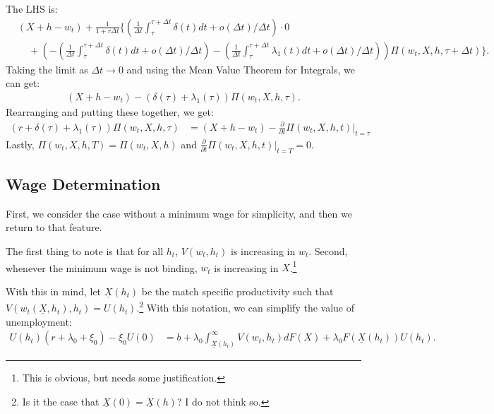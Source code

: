 \documentclass[11pt]{article}
\begin{document}
The LHS is:
\begin{align*}
         &(X + h - w_t) + \frac{1}{1+r\Delta t} \{
         ( \frac{1}{\Delta t}\textstyle\int_{\tau}^{\tau + \Delta t}
         \delta(t) dt + o(\Delta t)/\Delta t) \cdot 0 \\
         &\;\;\;\; +(-(\frac{1}{\Delta t}\textstyle\int_{\tau}^{\tau+\Delta t}
                       \delta(t)dt + o(\Delta
                       t)/\Delta t)-(\frac{1}{\Delta t}\textstyle\int_{\tau}^{\tau + \Delta t}
                       \lambda_1(t)dt + o(\Delta t)/\Delta t))
                   \Pi(w_t,X,h,\tau + \Delta t)\}
.\end{align*}
Taking the limit as $\Delta t \rightarrow 0$ and using the Mean Value Theorem for Integrals, we can get:
\begin{align*}
         (X + h - w_t) - (\delta(\tau) + \lambda_1(\tau)) \Pi(w_t,X,h,\tau )
.\end{align*}
Rearranging and putting these together, we get:
\begin{align*}
    (r +\delta(\tau) +\lambda_1(\tau)) \Pi(w_t,X,h,\tau)
         &=  (X + h - w_t) - \frac{\partial}{\partial t} \Pi(w_t,X,h,t)\Big|_{t = \tau}
\end{align*}
Lastly, $\Pi(w_t,X,h,T) = \Pi(w_t,X,h)$ and $\frac{\partial }{\partial t}
\Pi(w_t,X,h,t)\Big |_{t = T} = 0$.




\subsection[Wage Determination]{Wage Determination}%
\label{sub:wage_determination}

First, we consider the case without a minimum wage for simplicity, and then
we return to that feature.

The first thing to note is that for all $h_t$,  $V(w_t,h_t)$ is increasing
in  $w_t$. Second, whenever the minimum wage is not binding, $w_t$ is
increasing in $X$.\footnote{This is obvious, but needs some justification.}

With this in mind, let $\underline{X}(h_t)$ be the match specific productivity such that
$V(w_t(\underline{X},h_t),h_t) = U(h_t)$.\footnote{Is it the case that
$\underline{X}(0) = \underline{X}(h)$? I do not think so.} With this
notation, we can simplify the value of unemployment:
\begin{align*}
    U(h_t)(r+\lambda_0+\xi_0) - \xi_0 U(0) &= b + \lambda_0
    \int_{\underline{X}(h_t)}^{\infty} V(w_t, h_t) dF(X) +
    \lambda_0F(\underline{X}(h_t)) U(h_t)
.\end{align*}
\end{document}
